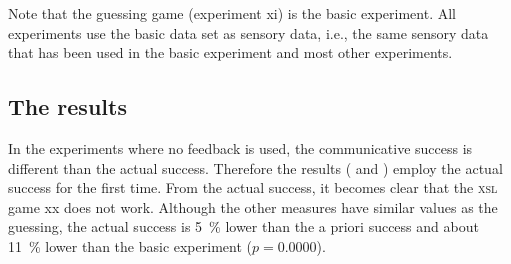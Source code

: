 Note that the guessing game (experiment {xi}) is the basic experiment. All experiments use the basic data set as sensory data, i.e., the same sensory data that has been used in the basic experiment and most other experiments.

\subsection{The results}


In the experiments where no feedback is used, the communicative success is different than the actual success. Therefore the results ( and ) employ the actual success for the first time. From the actual success, it becomes clear that the {\scshape xsl} game {xx} does not work. Although the other measures have similar values as the guessing, the actual success is 5~\% lower than the a priori success and about 11~\% lower than the basic experiment ($p=0.0000$).

